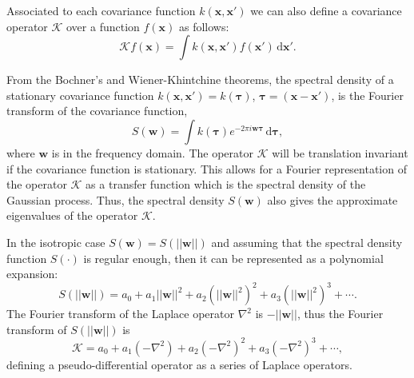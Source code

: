 Associated to each covariance function $k(\bm{x},\bm{x}')$ we can also define a covariance operator $\mathcal{K}$ over a function $f(\bm{x})$ as follows:
%
\begin{equation*}
\mathcal{K} f(\bm{x}) = \int k(\bm{x},\bm{x}') f(\bm{x}') \,\mathrm{d}\bm{x}'.
\end{equation*} 

From the Bochner’s and Wiener-Khintchine theorems, the spectral density of a stationary covariance function $k(\bm{x},\bm{x}') = k(\bm{\tau})$, $\bm{\tau}=(\bm{x}-\bm{x}')$, is the Fourier transform of the covariance function,
%
\begin{equation*}
S(\bm{w}) = \int k(\bm{\tau}) e^{-2\pi i \bm{w} \bm{\tau}} \,\mathrm{d}\bm{\tau}, \nonumber
\end{equation*}
where $\bm{w}$ is in the frequency domain. The operator $\mathcal{K}$ will be translation invariant if the covariance function is stationary. This allows for a Fourier representation of the operator $\mathcal{K}$ as a transfer function which is the spectral density of the Gaussian process. 
Thus, the spectral density $S(\bm{w})$ also gives the approximate eigenvalues of the operator $\mathcal{K}$.

In the isotropic case $S(\bm{w}) = S(||\bm{w}||)$ and assuming that the spectral density function $S(\cdot)$ is regular enough, then it can be represented as a polynomial expansion:
%
\begin{equation}\label{eq_S}
S(||\bm{w}||)=a_0+a_1||\bm{w}||^2+a_2(||\bm{w}||^2)^2+a_3(||\bm{w}||^2)^3+\cdots.
\end{equation}
The Fourier transform of the Laplace operator $\nabla^2$ is $-||\bm{w}||$, thus the Fourier transform of $S(||\bm{w}||)$ is
%
\begin{equation}\label{eq_K}
\mathcal{K}=a_0+a_1(-\nabla^2)+a_2(-\nabla^2)^2+a_3(-\nabla^2)^3+\cdots,
\end{equation}
defining a pseudo-differential operator as a series of Laplace operators.

